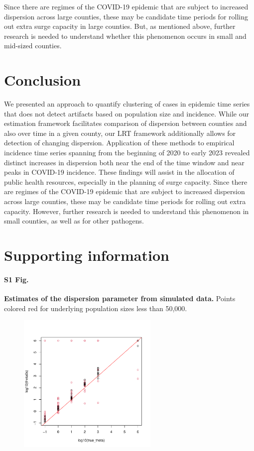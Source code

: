 \documentclass[10pt,letterpaper]{article}
\begin{document}
Since there are regimes of the COVID-19 epidemic that are subject to increased dispersion across large counties, these may be candidate time periods for rolling out extra surge capacity in large counties. But, as mentioned above, further research is needed to understand whether this phenomenon occurs in small and mid-sized counties. 

\section*{Conclusion}
We presented an approach to quantify clustering of cases in epidemic time series that does not detect artifacts based on population size and incidence. 
While our estimation framework facilitates comparison of dispersion between counties and also over time in a given county, our LRT framework additionally allows for detection of changing dispersion. 
Application of these methods to empirical incidence time series spanning from the beginning of 2020 to early 2023 revealed distinct increases in dispersion both near the end of the time window and near peaks in COVID-19 incidence. 
These findings will assist in the allocation of public health resources, especially in the planning of surge capacity. Since there are regimes of the COVID-19 epidemic that are subject to increased dispersion across large counties, these may be candidate time periods for rolling out extra capacity. However, further research is needed to understand this phenomenon in small counties, as well as for other pathogens.

\section*{Supporting information}

\paragraph*{S1 Fig.}
\label{S1_Fig}
{\bf Estimates of the dispersion parameter from simulated data.} Points colored red for underlying population sizes less than 50,000.
\begin{figure}[!h]
\centering
\includegraphics[width=0.6\textwidth]{thetaest_v_theta.pdf}
\label{S1}
\end{figure}
\end{document}
